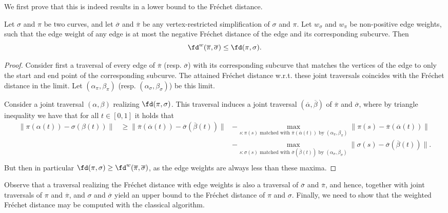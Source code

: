 \documentclass[english, thm-restate, notab]{lipics-v2021}
\begin{document}
We first prove that this is indeed results in a lower bound to the Fréchet distance.

\begin{lemma}\label{lem:weightedLowerbound}
    Let $\sigma$ and $\pi$ be two curves, and let $\overline{\sigma}$ and $\overline{\pi}$ be any vertex-restricted simplification of $\sigma$ and $\pi$. Let $w_\sigma$ and $w_\pi$ be non-positive edge weights, such that the edge weight of any edge is at most the negative Fréchet distance of the edge and its corresponding subcurve. Then
    \[\fd^w(\overline{\pi},\overline{\sigma})\leq \fd(\pi,\sigma).\]
\end{lemma}
\begin{proof}
    Consider first a traversal of every edge of $\overline{\pi}$ (resp. $\overline{\sigma}$) with its corresponding subcurve that matches the vertices  of the edge to only the start and end point of the corresponding subcurve. The attained Fréchet distance w.r.t. these joint traversals coincides with the Fréchet distance in the limit. Let $(\alpha_\pi,\beta_\pi)$ (resp. $(\alpha_\sigma,\beta_\sigma)$) be this limit.
    
    Consider a joint traversal $(\alpha,\beta)$ realizing $\fd(\pi,\sigma)$. This traversal induces a joint traversal $(\overline{\alpha},\overline{\beta})$ of $\overline{\pi}$ and $\overline{\sigma}$, where by triangle inequality we have that for all $t\in[0,1]$ it holds that
    \begin{align*}
        \|\pi(\alpha(t)) - \sigma(\beta(t))\|&\geq \|\overline{\pi}(\overline{\alpha}(t)) - \overline{\sigma}(\overline{\beta}(t))\| &- \max_{s:\pi(s)\text{ matched with }\overline{\pi}(\overline{\alpha}(t))\text{ by }(\alpha_\pi,\beta_\pi)}\|\pi(s) - \overline{\pi}(\overline{\alpha}(t))\|\\
        &  &- \max_{s:\sigma(s)\text{ matched with }\overline{\sigma}(\overline{\beta}(t))\text{ by }(\alpha_\sigma,\beta_\sigma)}\|\sigma(s) - \overline{\sigma}(\overline{\beta}(t))\|.\\
    \end{align*}
    But then in particular $\fd(\pi,\sigma)\geq \fd^w(\overline{\pi},\overline{\sigma})$, as the edge weights are always less than these maxima.
\end{proof}

Observe that a traversal realizing the Fréchet distance with edge weights is also a traversal of $\overline{\sigma}$ and $\overline{\pi}$, and hence, together with joint traversals of $\pi$ and $\overline{\pi}$, and $\sigma$ and $\overline{\sigma}$ yield an upper bound to the Fréchet distance of $\pi$ and $\sigma$. Finally, we need to show that the weighted Fréchet distance may be computed with the classical algorithm.
\end{document}
